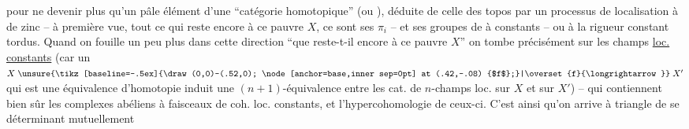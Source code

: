 pour ne devenir plus qu'un pâle élément d'une ``catégorie homotopique'' (ou ), déduite de celle des topos par un processus de localisation à  de zinc -- à première vue, tout ce qui reste encore à ce pauvre $X$, ce sont ses $\pi_i$ -- et ses groupes de  à  constants -- ou à la rigueur constant tordus. Quand on fouille un peu plus dans cette direction ``que reste-t-il encore à ce pauvre $X$'' on tombe précisément sur les champs \uline{loc.} \uline{constants} (car un $X\mathrel{\unsure{\tikz[baseline=-.5ex]{\draw (0,0)--(.52,0); \node[anchor=base,inner sep=0pt] at (.42,-.08) {$f$};}|\overset{f}{\longrightarrow}}}X'$ qui est une équivalence d'homotopie induit une $(n+1)$-équivalence entre les cat. de $n$-champs loc.  sur $X$ et sur $X'$) -- qui contiennent bien sûr les complexes  abéliens  à faisceaux de coh. loc. constants, et l'hypercohomologie de ceux-ci. C'est ainsi qu'on arrive à   triangle de  se déterminant mutuellement
